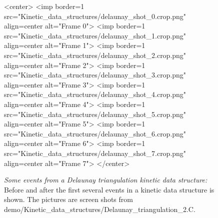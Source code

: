 \begin{figure}[htb]
\begin{ccTexOnly}
\begin{center}
\end{center}
\end{ccTexOnly}
\begin{ccHtmlOnly}
<center>
<imp border=1 src="Kinetic_data_structures/delaunay_shot_0.crop.png" align=center alt="Frame 0">
<imp border=1 src="Kinetic_data_structures/delaunay_shot_1.crop.png" align=center alt="Frame 1">
<imp border=1 src="Kinetic_data_structures/delaunay_shot_2.crop.png" align=center alt="Frame 2">
<imp border=1 src="Kinetic_data_structures/delaunay_shot_3.crop.png" align=center alt="Frame 3">
<imp border=1 src="Kinetic_data_structures/delaunay_shot_4.crop.png" align=center alt="Frame 4">
<imp border=1 src="Kinetic_data_structures/delaunay_shot_5.crop.png" align=center alt="Frame 5">
<imp border=1 src="Kinetic_data_structures/delaunay_shot_6.crop.png" align=center alt="Frame 6">
<imp border=1 src="Kinetic_data_structures/delaunay_shot_7.crop.png" align=center alt="Frame 7">
</center>
\end{ccHtmlOnly}
\caption{ \label{fig:delaunay_events} 
{\em Some events from a Delaunay triangulation kinetic data structure:} Before and after the first several events in a kinetic data structure is shown. The pictures are screen shots from demo/Kinetic\_data\_structures/Delaunay\_triangulation\_2.C. }
\end{figure}


\label{fig:delaunay_2_usage_program}
